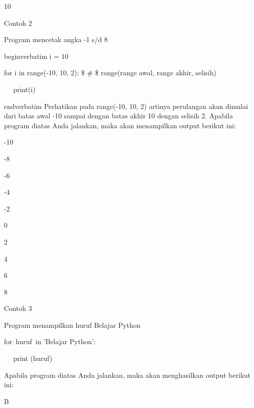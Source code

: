 10 \par
\vspace{\baselineskip}
Contoh 2\vspace{\baselineskip}
\vspace{\baselineskip}
 \par
 Program mencetak angka -1 s/d 8 \par
\vspace{12pt}
begin{verbatim}
i = 10 \par
for i in range(-10, 10, 2):  \$  \#  \$ range(range awal, range akhir, selisih) \par
~~ print(i) \par
end{verbatim}
\vspace{12pt}
\vspace{\baselineskip}
Perhatikan pada range(-10, 10, 2) artinya perulangan akan dimulai dari batas awal -10 sampai dengan batas akhir 10 dengan selisih 2.\vspace{\baselineskip}
\vspace{\baselineskip}
Apabila program diatas Anda jalankan, maka akan menampilkan output berikut ini:\vspace{\baselineskip}
\vspace{\baselineskip}
 \par
-10 \par
-8 \par
-6 \par
-4 \par
-2 \par
0 \par
2 \par
4 \par
6 \par
8 \par
\vspace{\baselineskip}
Contoh 3\vspace{\baselineskip}
\vspace{\baselineskip}
 \par
Program menampilkan huruf Belajar Python \par
for~huruf~in 'Belajar Python':    \par
~~ print (huruf) \par
\vspace{\baselineskip}
Apabila program diatas Anda jalankan, maka akan menghasilkan output berikut ini:\vspace{\baselineskip}
\vspace{\baselineskip}
 \par
B \par
